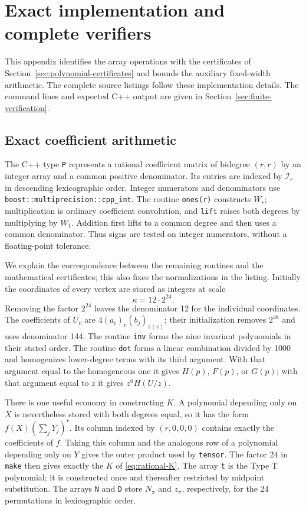\section{Exact implementation and complete verifiers}\label{app:verifiers}

This appendix identifies the array operations with the certificates of
Section~\ref{sec:polynomial-certificates} and bounds the auxiliary
fixed-width arithmetic.  The complete source listings follow these
implementation details.  The command lines and expected C++ output are
given in Section~\ref{sec:finite-verification}.

\subsection{Exact coefficient arithmetic}\label{app:implementation}

The C++ type \texttt{P} represents a rational coefficient matrix of bidegree
$(r,r)$ by an integer array and a common positive denominator.  Its entries
are indexed by $\mathcal I_r$ in descending lexicographic order.  Integer
numerators and denominators use \texttt{boost::multiprecision::cpp\_int}.
The routine \texttt{ones(r)} constructs $W_r$; multiplication is ordinary
coefficient convolution, and \texttt{lift} raises both degrees by multiplying
by $W_1$.  Addition first lifts to a common degree and then uses a common
denominator.  Thus signs are tested on integer numerators, without a
floating-point tolerance.

We explain the correspondence between the remaining routines and the
mathematical certificates; this also fixes the normalizations in the
listing.  Initially the coordinates of every vertex are stored as integers
at scale
\begin{equation}\label{eq:vertex-scale}
 \kappa=12\cdot2^{24}.
\end{equation}
Removing the factor $2^{24}$ leaves the denominator 12 for the individual
coordinates.  The coefficients of $U_v$ are
$4(a_i)_v(b_j)_{\pi(v)}$; their initialization removes $2^{48}$ and uses
denominator 144.  The routine \texttt{inv} forms the nine invariant
polynomials in their stated order.  The routine \texttt{dot} forms a linear
combination divided by 1000 and homogenizes lower-degree terms with its
third argument.  With that argument equal to the homogeneous one it gives
$H(p)$, $F(p)$, or $G(p)$; with that argument equal to $z$ it gives
$z^6H(U/z)$.

There is one useful economy in constructing $K$.  A polynomial depending
only on $X$ is nevertheless stored with both degrees equal, so it has the
form $f(X)(\sum_jY_j)^r$.  Its column indexed by $(r,0,0,0)$ contains exactly
the coefficients of $f$.  Taking this column and the analogous row of a
polynomial depending only on $Y$ gives the outer product used by
\texttt{tensor}.  The factor 24 in \texttt{make} then gives exactly the $K$
of \eqref{eq:rational-K}.  The array \texttt{t} is the Type T polynomial;
it is constructed once and thereafter restricted by midpoint substitution.
The arrays \texttt{N} and \texttt{D} store $N_\pi$ and $z_\pi$, respectively,
for the 24 permutations in lexicographic order.

